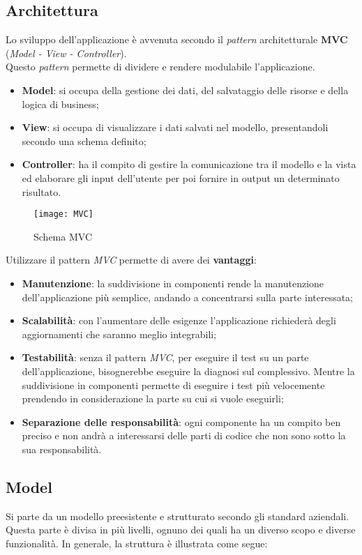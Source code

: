 \newpage
\subsection{Architettura}
Lo sviluppo dell'applicazione è avvenuta secondo il \textit{pattern} architetturale \textbf{MVC \glsfirstoccur} (\textit{Model - View - Controller}). \\
Questo \textit{pattern} permette di dividere e rendere modulabile l'applicazione.
\begin{itemize}
\item \textbf{Model}: si occupa della gestione dei dati, del salvataggio delle risorse e della logica di business;
\item \textbf{View}: si occupa di visualizzare i dati salvati nel modello, presentandoli secondo una schema definito;
\item \textbf{Controller}: ha il compito di gestire la comunicazione tra il modello e la vista ed elaborare gli input dell'utente per poi fornire in output un determinato risultato.
\end{itemize}

\begin{figure}[H]
    \centering 
    \texttt{[image: MVC]} 
    \bigskip
    \caption{Schema MVC}
\end{figure}

\noindent
Utilizzare il pattern \textit{MVC} permette di avere dei \textbf{vantaggi}:
\begin{itemize}
\item \textbf{Manutenzione}: la suddivisione in componenti rende la manutenzione dell'applicazione più semplice, andando a concentrarsi sulla parte interessata;
\item \textbf{Scalabilità}: con l'aumentare delle esigenze l'applicazione richiederà degli aggiornamenti che saranno meglio integrabili;
\item \textbf{Testabilità}: senza il pattern \textit{MVC}, per eseguire il test su un parte dell'applicazione, bisognerebbe eseguire la diagnosi sul complessivo. Mentre la suddivisione in componenti permette di eseguire i test più velocemente prendendo in considerazione la parte su cui si vuole eseguirli;
\item \textbf{Separazione delle responsabilità}: ogni componente ha un compito ben preciso e non andrà a interessarsi delle parti di codice che non sono sotto la sua responsabilità.
\end{itemize}

\subsection*{Model}
Si parte da un modello preesistente e strutturato secondo gli standard aziendali. Questa parte è divisa in più livelli, ognuno dei quali ha un diverso scopo e diverse funzionalità. In generale, la struttura è illustrata come segue: 

